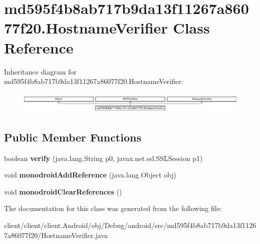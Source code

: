 \hypertarget{classmd595f4b8ab717b9da13f11267a86077f20_1_1HostnameVerifier}{}\section{md595f4b8ab717b9da13f11267a86077f20.\+Hostname\+Verifier Class Reference}
\label{classmd595f4b8ab717b9da13f11267a86077f20_1_1HostnameVerifier}
Inheritance diagram for md595f4b8ab717b9da13f11267a86077f20.\+Hostname\+Verifier\+:\begin{figure}[H]
\begin{center}
\leavevmode
\includegraphics[height=1.037037cm]{classmd595f4b8ab717b9da13f11267a86077f20_1_1HostnameVerifier}
\end{center}
\end{figure}
\subsection*{Public Member Functions}
\begin{DoxyCompactItemize}
\item 
\hypertarget{classmd595f4b8ab717b9da13f11267a86077f20_1_1HostnameVerifier_ae0dd21a3654e686589938d733076cac0}{}boolean {\bfseries verify} (java.\+lang.\+String p0, javax.\+net.\+ssl.\+S\+S\+L\+Session p1)\label{classmd595f4b8ab717b9da13f11267a86077f20_1_1HostnameVerifier_ae0dd21a3654e686589938d733076cac0}

\item 
\hypertarget{classmd595f4b8ab717b9da13f11267a86077f20_1_1HostnameVerifier_aa5193c07b682326dee1e8e8ea38330d4}{}void {\bfseries monodroid\+Add\+Reference} (java.\+lang.\+Object obj)\label{classmd595f4b8ab717b9da13f11267a86077f20_1_1HostnameVerifier_aa5193c07b682326dee1e8e8ea38330d4}

\item 
\hypertarget{classmd595f4b8ab717b9da13f11267a86077f20_1_1HostnameVerifier_a1ed7a6917b4a78f84dc55e6fb421a984}{}void {\bfseries monodroid\+Clear\+References} ()\label{classmd595f4b8ab717b9da13f11267a86077f20_1_1HostnameVerifier_a1ed7a6917b4a78f84dc55e6fb421a984}

\end{DoxyCompactItemize}


The documentation for this class was generated from the following file\+:\begin{DoxyCompactItemize}
\item 
client/client/client.\+Android/obj/\+Debug/android/src/md595f4b8ab717b9da13f11267a86077f20/Hostname\+Verifier.\+java\end{DoxyCompactItemize}
